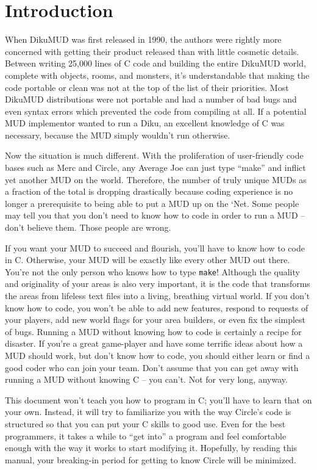 \documentclass[11pt]{article}
\begin{document}
\section{Introduction}
When DikuMUD was first released in 1990, the authors were rightly more concerned with getting their product released than with little cosmetic details.  Between writing 25,000 lines of C code and building the entire DikuMUD world, complete with objects, rooms, and monsters, it's understandable that making the code portable or clean was not at the top of the list of their priorities.  Most DikuMUD distributions were not portable and had a number of bad bugs and even syntax errors which prevented the code from compiling at all.  If a potential MUD implementor wanted to run a Diku, an excellent knowledge of C was necessary, because the MUD simply wouldn't run otherwise.
\par
Now the situation is much different.  With the proliferation of user-friendly code bases such as Merc and Circle, any Average Joe can just type ``make'' and inflict yet another MUD on the world.  Therefore, the number of truly unique MUDs as a fraction of the total is dropping drastically because coding experience is no longer a prerequisite to being able to put a MUD up on the `Net.  Some people may tell you that you don't need to know how to code in order to run a MUD -- don't believe them.  Those people are wrong.
\par
If you want your MUD to succeed and flourish, you'll have to know how to code in C.  Otherwise, your MUD will be exactly like every other MUD out there.  You're not the only person who knows how to type \texttt{make}!  Although the quality and originality of your areas is also very important, it is the code that transforms the areas from lifeless text files into a living, breathing virtual world.   If you don't know how to code, you won't be able to add new features, respond to requests of your players, add new world flags for your area builders, or even fix the simplest of bugs.  Running a MUD without knowing how to code is certainly a recipe for disaster.  If you're a great game-player and have some terrific ideas about how a MUD should work, but don't know how to code, you should either learn or find a good coder who can join your team.  Don't assume that you can get away with running a MUD without knowing C -- you can't.  Not for very long, anyway.
\par
This document won't teach you how to program in C; you'll have to learn that on your own.  Instead, it will try to familiarize you with the way Circle's code is structured so that you can put your C skills to good use. Even for the best programmers, it takes a while to ``get into'' a program and feel comfortable enough with the way it works to start modifying it. Hopefully, by reading this manual, your breaking-in period for getting to know Circle will be minimized.
\end{document}
